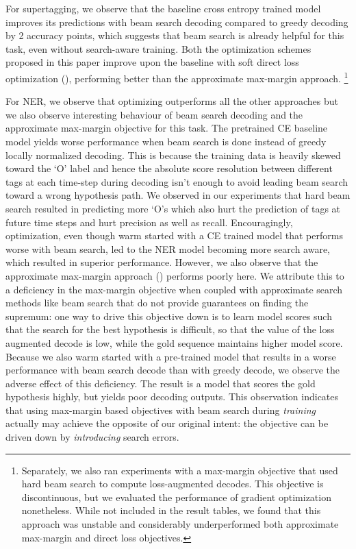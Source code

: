 \documentclass[letterpaper]{article} \usepackage{aaai18}  \usepackage{times}  \usepackage{helvet}  \usepackage{courier}  \usepackage{url}  \usepackage{graphicx}  \frenchspacing
\begin{document}
For supertagging, we observe that the baseline cross entropy trained model improves its predictions with  beam search decoding compared to greedy decoding by 2 accuracy points, which suggests that beam search is already helpful for this task, even without search-aware training. Both the optimization schemes proposed in this paper improve upon the baseline with soft direct loss optimization (), performing better than the approximate max-margin approach. \footnote{Separately, we also ran experiments with a max-margin objective that used hard beam search to compute loss-augmented decodes. This objective is discontinuous, but we evaluated the performance of gradient optimization nonetheless. While not included in the result tables, we found that this approach was unstable and considerably underperformed both approximate max-margin and 
direct loss objectives.} 

For NER, we observe that optimizing  outperforms all the other approaches but we also observe interesting behaviour of beam search decoding and the approximate max-margin objective for this task. The pretrained CE baseline model yields worse performance when beam search is done instead of greedy locally normalized decoding. This is because the training data is heavily skewed toward the `O' label and hence the absolute score resolution between different tags at each time-step during decoding isn't enough to avoid leading beam search toward a wrong hypothesis path. We observed in our experiments that hard beam search resulted in predicting more `O's which also hurt the prediction of tags at future time steps and hurt precision as well as recall. Encouragingly,  optimization, even though warm started with a CE trained model that performs worse with beam search, led to the NER model becoming more search aware, which resulted in superior performance. However, we also observe that the approximate max-margin approach () performs poorly here. We attribute this to a deficiency in the max-margin objective when coupled with approximate search methods like beam search that do not provide guarantees on finding the supremum: one way to drive this objective down is to learn model scores such that the search for the best hypothesis is difficult, so that the value of the loss augmented decode is low, while the gold sequence maintains higher model score. Because we also warm started with a pre-trained model that results in a worse performance with beam search decode than with greedy decode, we observe the adverse effect of this deficiency. The result is a model that scores the gold hypothesis highly, but yields poor decoding outputs. This observation indicates that using max-margin based objectives with beam search during \emph{training} actually may achieve the opposite of our original intent: the objective can be driven down by \emph{introducing} search errors.
\end{document}
